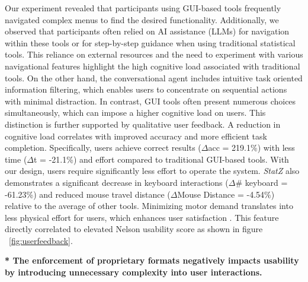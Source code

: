 \documentclass{article}
\begin{document}
Our experiment revealed that participants using GUI-based tools frequently navigated complex menus to find the desired functionality. Additionally, we observed that participants often relied on AI assistance (LLMs) for navigation within these tools or for step-by-step guidance when using traditional statistical tools. This reliance on external resources and the need to experiment with various navigational features highlight the high cognitive load associated with traditional tools. On the other hand, the conversational agent includes intuitive task oriented information filtering, which enables users to concentrate on sequential actions with minimal distraction. In contrast, GUI tools often present numerous choices simultaneously, which can impose a higher cognitive load on users. This distinction is further supported by qualitative user feedback. A reduction in cognitive load correlates with improved accuracy and more efficient task completion. Specifically, users achieve correct results ($\Delta$acc = 219.1\%) with less time ($\Delta$t = -21.1\%) and effort compared to traditional GUI-based tools. With our design, users require significantly less effort to operate the system. \textit{StatZ} also demonstrates a significant decrease in keyboard interactions ($\Delta$\# keyboard = -61.23\%) and reduced mouse travel distance ($\Delta$Mouse Distance = -4.54\%) relative to the average of other tools. Minimizing motor demand translates into less physical effort for users, which enhances user satisfaction \cite{accot1997beyond}. This feature directly correlated to elevated Nelson usability score as shown in figure ~\ref{fig:userfeedback}. 


\textbf{* The enforcement of proprietary formats negatively impacts usability by introducing unnecessary complexity into user interactions.}
\end{document}
